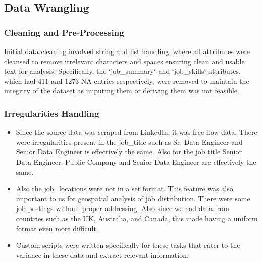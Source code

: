 \documentclass[a4paper,10pt]{article}
\begin{document}
\subsection{Data Wrangling}
    \subsubsection{Cleaning and Pre-Processing}
    Initial data cleaning involved string and list handling, where all attributes were cleansed to remove irrelevant characters and spaces ensuring clean and usable text for analysis. Specifically, the `job\_summary` and `job\_skills` attributes, which had 411 and 1273 NA entries respectively, were removed to maintain the integrity of the dataset as imputing them or deriving them was not feasible.

    \subsubsection{Irregularities Handling}
        \begin{itemize}
        \item  Since the source data was scraped from LinkedIn, it was free-flow data. There were irregularities present in the job\_title such as Sr. Data Engineer and Senior Data Engineer is effectively the same. Also for the job title Senior Data Engineer, Public Company and Senior Data Engineer are effectively the same. 
        \item Also the job\_locations were not in a set format. This feature was also important to us for geospatial analysis of job distribution. There were some job postings without proper addressing. Also since we had data from countries such as the UK, Australia, and Canada, this made having a uniform format even more difficult.
        \item  Custom scripts were written specifically for these tasks that cater to the variance in these data and extract relevant information.
    \end{itemize}
    
\end{document}
